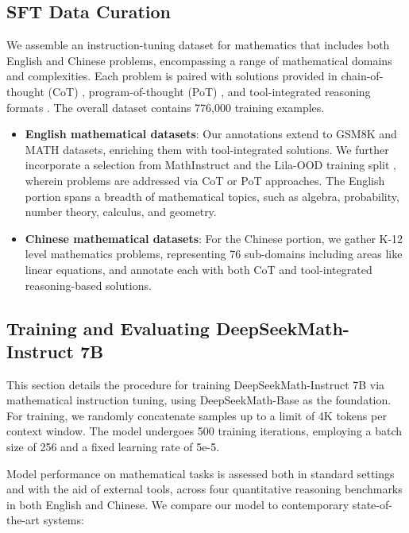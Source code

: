 \subsection{SFT Data Curation}

We assemble an instruction-tuning dataset for mathematics that includes both English and Chinese problems, encompassing a range of mathematical domains and complexities. Each problem is paired with solutions provided in chain-of-thought (CoT) \citep{cot}, program-of-thought (PoT) \citep{pot,pal}, and tool-integrated reasoning formats \citep{tora}. The overall dataset contains 776,000 training examples.

\begin{itemize}[topsep=0pt]
    \item \textbf{English mathematical datasets}: Our annotations extend to GSM8K and MATH datasets, enriching them with tool-integrated solutions. We further incorporate a selection from MathInstruct \citep{MathInstruct} and the Lila-OOD training split \citep{lila}, wherein problems are addressed via CoT or PoT approaches. The English portion spans a breadth of mathematical topics, such as algebra, probability, number theory, calculus, and geometry.
    \item \textbf{Chinese mathematical datasets}: For the Chinese portion, we gather K-12 level mathematics problems, representing 76 sub-domains including areas like linear equations, and annotate each with both CoT and tool-integrated reasoning-based solutions.
\end{itemize}

\subsection{Training and Evaluating DeepSeekMath-Instruct 7B}

This section details the procedure for training DeepSeekMath-Instruct 7B via mathematical instruction tuning, using DeepSeekMath-Base as the foundation. For training, we randomly concatenate samples up to a limit of 4K tokens per context window. The model undergoes 500 training iterations, employing a batch size of 256 and a fixed learning rate of 5e-5.

Model performance on mathematical tasks is assessed both in standard settings and with the aid of external tools, across four quantitative reasoning benchmarks in both English and Chinese. We compare our model to contemporary state-of-the-art systems:

